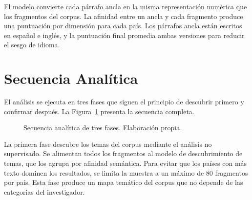 El modelo convierte cada párrafo ancla en la misma representación numérica que los fragmentos del corpus. La afinidad entre un ancla y cada fragmento produce una puntuación por dimensión para cada país. Los párrafos ancla están escritos en español e inglés, y la puntuación final promedia ambas versiones para reducir el sesgo de idioma.


\section{Secuencia Analítica}

El análisis se ejecuta en tres fases que siguen el principio de descubrir primero y confirmar después. La Figura~\ref{fig:secuencia} presenta la secuencia completa.

\begin{figure}[htbp]
\centering
{}
\caption{Secuencia analítica de tres fases. Elaboración propia.}
\label{fig:secuencia}
\end{figure}

La primera fase descubre los temas del corpus mediante el análisis no supervisado. Se alimentan todos los fragmentos al modelo de descubrimiento de temas, que los agrupa por afinidad semántica. Para evitar que los países con más texto dominen los resultados, se limita la muestra a un máximo de 80 fragmentos por país. Esta fase produce un mapa temático del corpus que no depende de las categorías del investigador.

